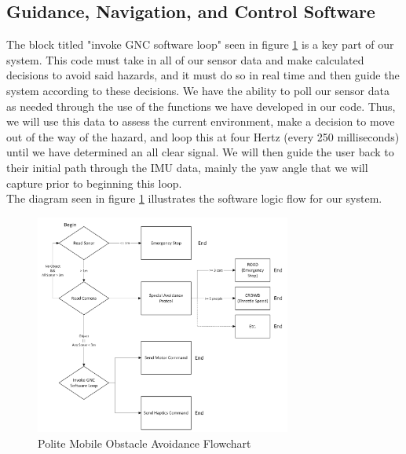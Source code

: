 \subsection{Guidance, Navigation, and Control Software} \label{GNC_Software}
\noindent The block titled "invoke GNC software loop" seen in figure \ref{fig:Polite-Mobile-Obstacle-Avoidance-Flowchart} is a key part of our system. This code must take in all of our sensor data and make calculated decisions to avoid said hazards, and it must do so in real time and then guide the system according to these decisions. We have the ability to poll our sensor data as needed through the use of the functions we have developed in our code. Thus, we will use this data to assess the current environment, make a decision to move out of the way of the hazard, and loop this at four Hertz (every 250 milliseconds) until we have determined an all clear signal. We will then guide the user back to their initial path through the IMU data, mainly the yaw angle that we will capture prior to beginning this loop. \\
\noindent The diagram seen in figure \ref{fig:Polite-Mobile-Obstacle-Avoidance-Flowchart} illustrates the software logic flow for our system. \\

\begin{figure}[H]
	\centering
	\includegraphics[width=0.75\textwidth]{./Images/Polite-Mobile-Obstacle-Avoidance-Flowchart.png}
	\caption{\label{fig:Polite-Mobile-Obstacle-Avoidance-Flowchart}Polite Mobile Obstacle Avoidance Flowchart}
\end{figure}

